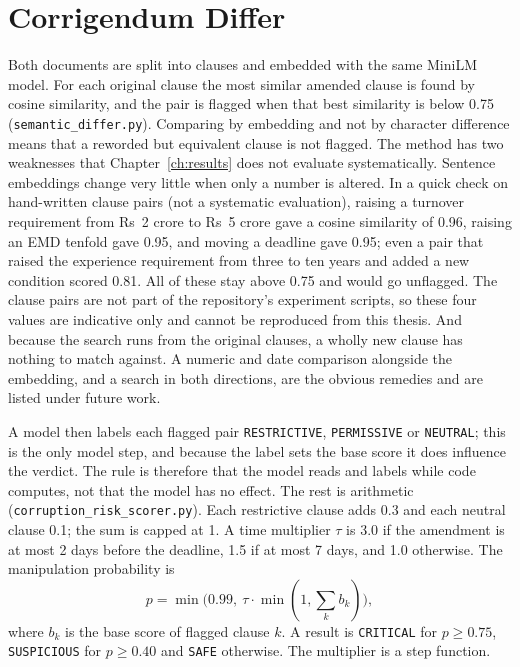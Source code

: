 \section{Corrigendum Differ}
\label{sec:differ}
Both documents are split into clauses and embedded with the same MiniLM model. For each original clause the most similar amended clause is found by cosine similarity, and the pair is flagged when that best similarity is below 0.75 (\texttt{semantic\_differ.py}). Comparing by embedding and not by character difference means that a reworded but equivalent clause is not flagged. The method has two weaknesses that Chapter~\ref{ch:results} does not evaluate systematically. Sentence embeddings change very little when only a number is altered. In a quick check on hand-written clause pairs (not a systematic evaluation), raising a turnover requirement from Rs~2 crore to Rs~5 crore gave a cosine similarity of 0.96, raising an EMD tenfold gave 0.95, and moving a deadline gave 0.95; even a pair that raised the experience requirement from three to ten years and added a new condition scored 0.81. All of these stay above 0.75 and would go unflagged. The clause pairs are not part of the repository's experiment scripts, so these four values are indicative only and cannot be reproduced from this thesis. And because the search runs from the original clauses, a wholly new clause has nothing to match against. A numeric and date comparison alongside the embedding, and a search in both directions, are the obvious remedies and are listed under future work.

A model then labels each flagged pair \texttt{RESTRICTIVE}, \texttt{PERMISSIVE} or \texttt{NEUTRAL}; this is the only model step, and because the label sets the base score it does influence the verdict. The rule is therefore that the model reads and labels while code computes, not that the model has no effect. The rest is arithmetic (\texttt{corruption\_risk\_scorer.py}). Each restrictive clause adds 0.3 and each neutral clause 0.1; the sum is capped at 1. A time multiplier $\tau$ is 3.0 if the amendment is at most 2 days before the deadline, 1.5 if at most 7 days, and 1.0 otherwise. The manipulation probability is
\begin{equation}
p=\min\bigl(0.99,\ \tau\cdot\min(1,\textstyle\sum_k b_k)\bigr),
\end{equation}
where $b_k$ is the base score of flagged clause $k$. A result is \texttt{CRITICAL} for $p\ge 0.75$, \texttt{SUSPICIOUS} for $p\ge 0.40$ and \texttt{SAFE} otherwise. The multiplier is a step function.

